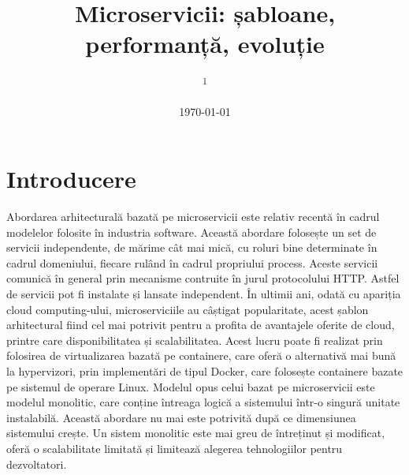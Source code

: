 \documentclass[12pt, a4paper, twocolumn]{article} %
\title{Microservicii: șabloane, performanță, evoluție} %
\author{
	\authorstyle{Sergiu Breban\textsuperscript{1}} %
	\newline\newline %
	\textsuperscript{1}\institution{Universitatea Babeș-Bolyai, Cluj-Napoca, Cluj}\\ %
}
\date{\today} %
\begin{document}
\maketitle %

\thispagestyle{firstpage} %




\section{Introducere}

Abordarea arhitecturală bazată pe microservicii este relativ recentă în cadrul modelelor folosite în industria software. Această abordare folosește un set de servicii independente, de mărime cât mai mică, cu roluri bine determinate în cadrul domeniului, fiecare rulând în cadrul propriului process. Aceste servicii comunică în general prin mecanisme contruite în jurul protocolului HTTP.\citep{uckelmann2011architectural} Astfel de servicii pot fi instalate și lansate independent. În ultimii ani, odată cu apariția cloud computing-ului, microserviciile au câștigat popularitate, acest șablon arhitectural fiind cel mai potrivit pentru a profita de avantajele oferite de cloud, printre care disponibilitatea și scalabilitatea. Acest lucru poate fi realizat prin folosirea de virtualizarea bazată pe containere, care oferă o alternativă mai bună la hypervizori\citep{soltesz2007container}, prin implementări de tipul Docker, care folosește containere bazate pe sistemul de operare Linux. Modelul opus celui bazat pe microservicii este modelul monolitic, care conține întreaga logică a sistemului într-o singură unitate instalabilă.\citep{richardson2014pattern} Această abordare nu mai este potrivită după ce dimensiunea sistemului crește. Un sistem monolitic este mai greu de întreținut și modificat, oferă o scalabilitate limitată și limitează alegerea tehnologiilor pentru dezvoltatori.\citep{dragoni2017microservices}
\end{document}

